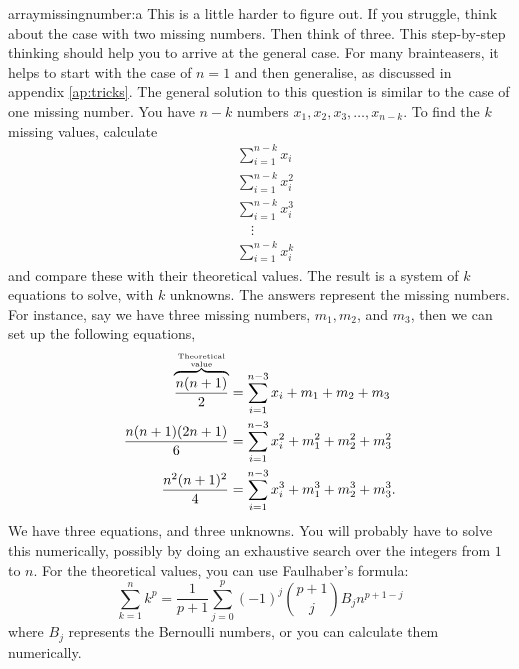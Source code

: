 \begin{subanswer}{arraymissingnumber:a}
This is a little harder to figure out.
If you struggle, think about the case with two missing numbers.
Then think of three.
This step-by-step thinking should help you to arrive at the general case.
For many brainteasers, it helps to start with the case of $n=1$ and then generalise, as discussed in appendix \ref{ap:tricks}.
The general solution to this question is similar to the case of one missing number.
You have $n-k$ numbers $x_1, x_2, x_3, \ldots , x_{n-k}$.
To find the $k$ missing values, calculate
\begin{align*}
& \sum_{i=1}^{n-k}{ x_i   } \\
& \sum_{i=1}^{n-k}{ x_i^2 } \\
& \sum_{i=1}^{n-k}{ x_i^3 } \\
& \quad\vdots \\
& \sum_{i=1}^{n-k}{ x_i^k }
\end{align*}
and compare these with their theoretical values.
The result is a system of $k$ equations to solve, with $k$ unknowns.
The answers represent the missing numbers.
For instance, say we have three missing numbers, $m_1, m_2$, and $m_3$, then we can set up the following equations,
\begin{align*}
 \overbrace{\frac{n(n+1)}{2}}^{ \text{Theoretical} \atop \text{value} }
 &=
 \sum_{i=1}^{n-3}{ x_i }
+  m_1 + m_2 + m_3
\\
 \frac{n(n+1)(2n + 1)}{6}
 &=
 \sum_{i=1}^{n-3}{ x_i^2 }
+ m_1^2 + m_2^2 + m_3^2
\\
 \frac{n^2(n+1)^2}{4}
 &=
 \sum_{i=1}^{n-3}{ x_i^3 }
+ m_1^3 + m_2^3 + m_3^3
\text{.}
\end{align*}
We have three equations, and three unknowns.
You will probably have to solve this numerically, possibly by doing an exhaustive search over the integers from $1$ to $n$.
For the theoretical values, you can use Faulhaber's formula:
\[
  \sum_{k=1}^{n}{k^p} = \frac{1}{p+1} \sum_{j=0}^{p}{ (-1)^j \binom{p+1}{j} B_j n^{p+1-j} }
\]
where $B_j$ represents the Bernoulli numbers, or you can calculate them numerically.


\end{subanswer}



